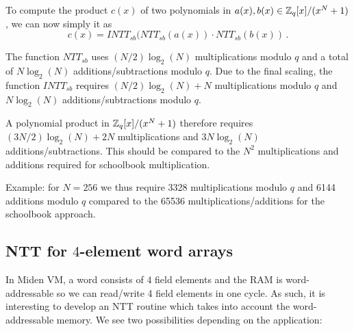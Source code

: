 \begin{algorithm}[!t] \label{algo:intt_sb}
\begin{scriptsize}
\caption{\emph{$INTT_{sb}$}}
\end{scriptsize}
\end{algorithm} 

To compute the product $c(x)$ of two polynomials in $a(x), b(x) \in \mathbb{Z}_q[x]/(x^N+1)$, we can now simply it as 
\[  c(x) = INTT_{sb}(NTT_{sb}(a(x)) \cdot NTT_{sb}(b(x)) \, . \]

The function $NTT_{sb}$ uses $(N/2) \log_2(N)$ multiplications modulo $q$ and a total of $N \log_2(N)$ additions/subtractions modulo $q$.
Due to the final scaling, the function $INTT_{sb}$ requires $(N/2) \log_2(N) + N$ multiplications modulo $q$ and 
$N \log_2(N)$ additions/subtractions modulo $q$.

A polynomial product in $\mathbb{Z}_q[x]/(x^N+1)$ therefore requires $(3N/2) \log_2(N) + 2N$ multiplications and $3 N \log_2(N)$ 
additions/subtractions.  This should be compared to the $N^2$ multiplications and additions required for schoolbook multiplication.

Example: for $N = 256$ we thus require 3328 multiplications modulo $q$ and 6144 additions modulo $q$ compared to the 
65536 multiplications/additions for the schoolbook approach.

\subsection{NTT for $4$-element word arrays}

In Miden VM, a word consists of $4$ field elements and the RAM is word-addressable so we can read/write 4 field
elements in one cycle.  As such, it is interesting to develop an NTT routine which takes into account the word-addressable
memory.   We see two possibilities depending on the application:


